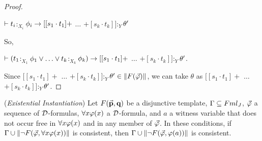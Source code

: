\begin{proof}
	\begin{center}
		$\vdash t_{i}$$:_{X_{i}}$$\phi_{i}  \rightarrow  [[s_{1} \cdot t_{1}] +$ $\dots$ $+ [s_{k} \cdot t_{k}]]$$:_{Y}$$\theta^{\prime}$
	\end{center}
So,
	
	\begin{center}
		$\vdash (t_{1}$$:_{X_{1}}$$\phi_{1} \ou \dots \ou t_{k}$$:_{X_{k}}$$\phi_{k} )   \rightarrow  [[s_{1} \cdot t_{1}] +$ $\dots$ $+ [s_{k} \cdot t_{k}]]$$:_{Y}$$\theta^{\prime}$.
	\end{center}
	
	\qquad Since $[[s_{1} \cdot t_{1}] +$ $\dots$ $+ [s_{k} \cdot t_{k}]]$$:_{Y}$$\theta^{\prime} \in \Arrowvert F(\vec{\varphi}) \Arrowvert$, we can take $\theta$ as $[[s_{1} \cdot t_{1}] +$ $\dots$ $+ [s_{k} \cdot t_{k}]]$$:_{Y}$$\theta^{\prime}$.
\end{proof}

\begin{pro}(\textit{Existential Instantiation})
	Let $F(\vec{\textbf{p}},\textbf{q})$ be a disjunctive template, $\Gamma \subseteq Fml_{J}$, $\vec{\varphi}$ a sequence of $\mathcal{D}$-formulas,  $\forall x \varphi(x)$ a $\mathcal{D}$-formula, and $a$ a witness variable that does not occur free in $\forall x \varphi(x)$ and in any member of $\vec{\varphi}$. In these conditions, if $\Gamma \cup \Arrowvert \neg F(\vec{\varphi},\forall x\varphi(x)) \Arrowvert$ is consistent, then $\Gamma \cup \Arrowvert \neg F(\vec{\varphi},\varphi(a)) \Arrowvert$ is consistent.    
\end{pro}


